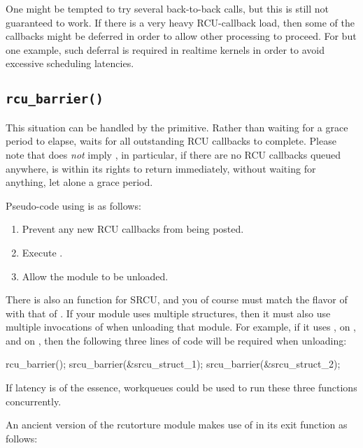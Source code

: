 One might be tempted to try several back-to-back 
calls, but this is still not guaranteed to work.
If there is a very
heavy RCU-callback load, then some of the callbacks might be deferred in
order to allow other processing to proceed.
For but one example, such
deferral is required in realtime kernels in order to avoid excessive
scheduling latencies.


\subsection{\texttt{rcu\_barrier()}}
\label{sec:rcu:rcu_barrier()}

This situation can be handled by the  primitive.
Rather
than waiting for a grace period to elapse,  waits for all
outstanding RCU callbacks to complete.
Please note that 
does \emph{not} imply , in particular, if there are no RCU
callbacks queued anywhere,  is within its rights to return
immediately, without waiting for anything, let alone a grace period.

Pseudo-code using  is as follows:

\begin{enumerate}
\item Prevent any new RCU callbacks from being posted.
\item Execute .
\item Allow the module to be unloaded.
\end{enumerate}

There is also an  function for SRCU, and you of course
must match the flavor of  with that of .
If your module uses multiple  structures, then it must also
use multiple invocations of  when unloading that module.
For example, if it uses ,  on , and
 on , then the following three lines of code
will be required when unloading:

\begin{VerbatimN}
  rcu_barrier();
  srcu_barrier(&srcu_struct_1);
  srcu_barrier(&srcu_struct_2);
\end{VerbatimN}

If latency is of the essence, workqueues could be used to run these
three functions concurrently.

An ancient version of the rcutorture module makes use of 
in its exit function as follows:

